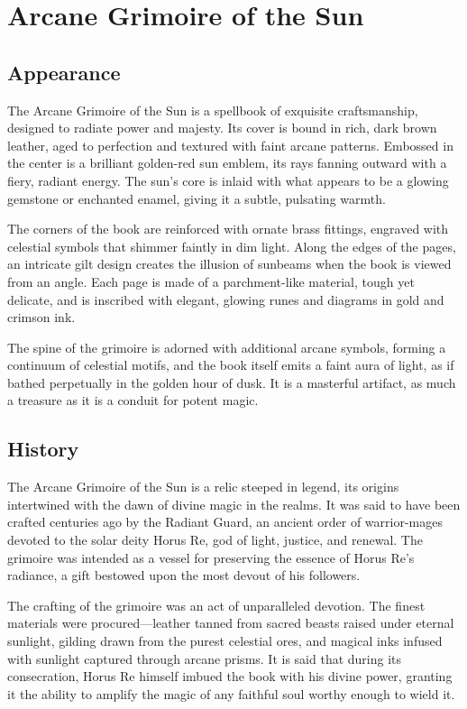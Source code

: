 \ItemSubCategory{}

\chapter*{Arcane Grimoire of the Sun}
\section*{Appearance}
The Arcane Grimoire of the Sun is a spellbook of exquisite craftsmanship, designed to radiate power and majesty. Its cover is bound in rich, dark brown leather, aged to perfection and textured with faint arcane patterns. Embossed in the center is a brilliant golden-red sun emblem, its rays fanning outward with a fiery, radiant energy. The sun's core is inlaid with what appears to be a glowing gemstone or enchanted enamel, giving it a subtle, pulsating warmth.

The corners of the book are reinforced with ornate brass fittings, engraved with celestial symbols that shimmer faintly in dim light. Along the edges of the pages, an intricate gilt design creates the illusion of sunbeams when the book is viewed from an angle. Each page is made of a parchment-like material, tough yet delicate, and is inscribed with elegant, glowing runes and diagrams in gold and crimson ink.

The spine of the grimoire is adorned with additional arcane symbols, forming a continuum of celestial motifs, and the book itself emits a faint aura of light, as if bathed perpetually in the golden hour of dusk. It is a masterful artifact, as much a treasure as it is a conduit for potent magic.

\section*{History}
The Arcane Grimoire of the Sun is a relic steeped in legend, its origins intertwined with the dawn of divine magic in the realms. It was said to have been crafted centuries ago by the Radiant Guard, an ancient order of warrior-mages devoted to the solar deity Horus Re, god of light, justice, and renewal. The grimoire was intended as a vessel for preserving the essence of Horus Re's radiance, a gift bestowed upon the most devout of his followers.

The crafting of the grimoire was an act of unparalleled devotion. The finest materials were procured—leather tanned from sacred beasts raised under eternal sunlight, gilding drawn from the purest celestial ores, and magical inks infused with sunlight captured through arcane prisms. It is said that during its consecration, Horus Re himself imbued the book with his divine power, granting it the ability to amplify the magic of any faithful soul worthy enough to wield it.

